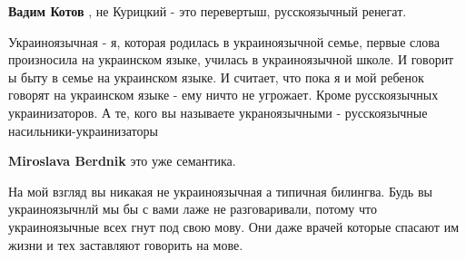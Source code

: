 \begin{itemize}
\begin{itemize}
\textbf{Вадим Котов} , не Курицкий - это перевертыш, русскоязычный ренегат.

Украиноязычная - я, которая родилась в украиноязычной семье, первые слова
произносила на украинском языке, училась в украиноязычной школе. И говорит ы
быту в семье на украинском языке. И считает, что пока я и мой ребенок говорят
на украинском языке - ему ничто не угрожает. Кроме русскоязычных
украинизаторов. А те, кого вы называете украноязычными - русскоязычные
насильники-украинизаторы

 
\textbf{Miroslava Berdnik} это уже семантика.

На мой взгляд вы никакая не украиноязычная а типичная билингва. Будь вы
украиноязычнлй мы бы с вами лаже не разговаривали, потому что украиноязычные
всех гнут под свою мову. Они даже врачей которые спасают им жизни и тех
заставляют говорить на мове.

\end{itemize}

 



\end{itemize}

